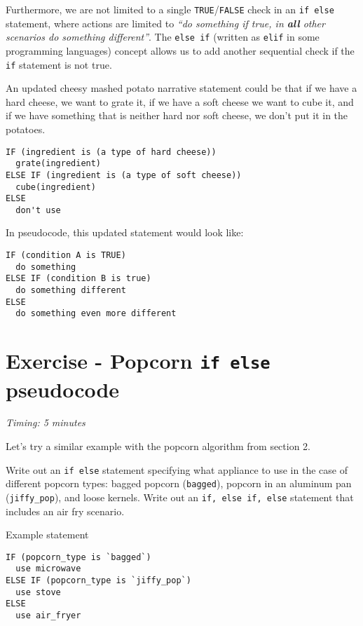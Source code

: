 \documentclass[
]{book}
\begin{document}
Furthermore, we are not limited to a single \texttt{TRUE}/\texttt{FALSE} check in an \texttt{if\ else} statement, where actions are limited to \emph{``do something if true, in \textbf{all} other scenarios do something different''}. The \texttt{else\ if} (written as \texttt{elif} in some programming languages) concept allows us to add another sequential check if the \texttt{if} statement is not true.

An updated cheesy mashed potato narrative statement could be that if we have a hard cheese, we want to grate it, if we have a soft cheese we want to cube it, and if we have something that is neither hard nor soft cheese, we don't put it in the potatoes.

\begin{verbatim}
IF (ingredient is (a type of hard cheese))
  grate(ingredient)
ELSE IF (ingredient is (a type of soft cheese))
  cube(ingredient)
ELSE
  don't use
\end{verbatim}

In pseudocode, this updated statement would look like:

\begin{verbatim}
IF (condition A is TRUE)
  do something
ELSE IF (condition B is true)
  do something different
ELSE 
  do something even more different
\end{verbatim}

\section{\texorpdfstring{Exercise - Popcorn \texttt{if\ else} pseudocode}{Exercise - Popcorn if else pseudocode}}\label{exercise---popcorn-if-else-pseudocode}

\emph{Timing: 5 minutes}

Let's try a similar example with the popcorn algorithm from section 2.

Write out an \texttt{if\ else} statement specifying what appliance to use in the case of
different popcorn types: bagged popcorn (\texttt{bagged}), popcorn in an aluminum pan (\texttt{jiffy\_pop}),
and loose kernels.
Write out an \texttt{if,\ else\ if,\ else} statement that includes an air fry scenario.

Example statement

\begin{verbatim}
IF (popcorn_type is `bagged`)
  use microwave
ELSE IF (popcorn_type is `jiffy_pop`)
  use stove
ELSE 
  use air_fryer
\end{verbatim}
\end{document}
